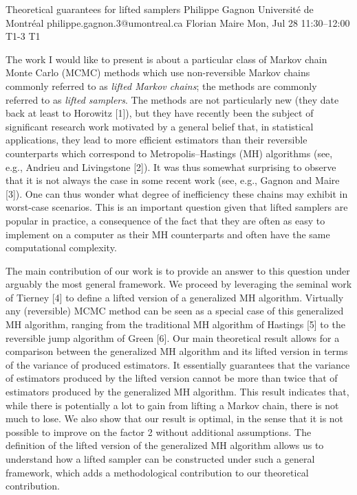 \documentclass[12pt,lettersize,oneside]{book} %
\begin{document}
\begin{talk}
  {Theoretical guarantees for lifted samplers}%
  {Philippe Gagnon}%
  {Universit\'e de Montr\'eal}%
  {philippe.gagnon.3@umontreal.ca}%
  {Florian Maire}%
  {}%
  {Mon, Jul 28 11:30--12:00}%
  {T1-3}%
  {T1}%
  {}%
    
   
The work I would like to present is about a particular class of Markov chain Monte Carlo (MCMC) methods which use non-reversible Markov chains commonly referred to as \textit{lifted Markov chains}; the methods are commonly referred to as \textit{lifted samplers}. The methods are not particularly new (they date back at least to Horowitz [1]), but they have recently been the subject of significant research work motivated by a general belief that, in statistical applications, they lead to more efficient estimators than their reversible counterparts which correspond to Metropolis--Hastings (MH) algorithms (see, e.g., Andrieu and Livingstone [2]). It was thus somewhat surprising to observe that it is not always the case in some recent work (see, e.g., Gagnon and Maire [3]). One can thus wonder what degree of inefficiency these chains may exhibit in worst-case scenarios. This is an important question given that lifted samplers are popular in practice, a consequence of the fact that they are often as easy to implement on a computer as their MH counterparts and often have the same computational complexity.

The main contribution of our work is to provide an answer to this question under arguably the most general framework. We proceed by leveraging the seminal work of Tierney [4] to define a lifted version of a generalized MH algorithm. Virtually any (reversible) MCMC method can be seen as a special case of this generalized MH algorithm, ranging from the traditional MH algorithm of Hastings [5] to the reversible jump algorithm of Green [6]. Our main theoretical result allows for a comparison between the generalized MH algorithm and its lifted version in terms of the variance of produced estimators. It essentially guarantees that the variance of estimators produced by the lifted version cannot be more than twice that of estimators produced by the generalized MH algorithm. This result indicates that, while there is potentially a lot to gain from lifting a Markov chain, there is not much to lose. We also show that our result is optimal, in the sense that it is not possible to improve on the factor 2 without additional assumptions. The definition of the lifted version of the generalized MH algorithm allows us to understand how a lifted sampler can be constructed under such a general framework, which adds a methodological contribution to our theoretical contribution.


\end{talk}
\end{document}
